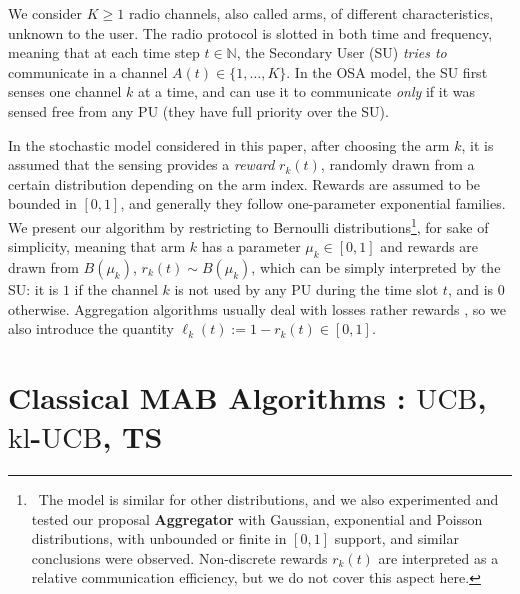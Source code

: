 \documentclass[conference]{IEEEtran}
\theoremstyle{plain}  %
\newcommand{\UCB}[0]{$\mathrm{UCB}$}
\newcommand{\klUCB}[0]{$\mathrm{kl}$-$\mathrm{UCB}$}
\newcommand{\Aggr}[0]{\textbf{Aggregator}}
\begin{document}
We consider $K \ge 1$ radio channels, also called arms, of different characteristics, unknown to the user.
The radio protocol is slotted in both time and frequency,
meaning that at each time step $t \in \mathbb{N}$,
the Secondary User (SU) \emph{tries to}
communicate in a channel $A(t) \in \{1, \dots, K\}$.
In the OSA model, the SU first senses one channel $k$ at a time, and can use it to communicate
\emph{only} if it was sensed free from any PU
(they have full priority over the SU).

In the stochastic model considered in this paper, after choosing the arm $k$, it is assumed that the sensing provides a \emph{reward} $r_k(t)$, randomly drawn from a certain distribution depending on the arm index.
Rewards are assumed to be bounded in $[0, 1]$,
and generally they follow one-parameter exponential families.
We present our algorithm by restricting to Bernoulli distributions\footnote{~The model is similar for other distributions, and we also experimented and tested our proposal \Aggr{} with Gaussian, exponential and Poisson distributions, with unbounded or finite in $[0, 1]$ support, and similar conclusions were observed. Non-discrete rewards $r_k(t)$ are interpreted as a relative communication efficiency, but we do not cover this aspect here.},
for sake of simplicity, meaning that arm $k$ has a parameter $\mu_k \in [0, 1]$ and rewards are drawn from $B(\mu_k)$, $r_k(t) \sim B(\mu_k)$,
which can be simply interpreted by the SU: it is $1$ if the channel $k$ is not used by any PU during the time slot $t$, and is $0$ otherwise.
Aggregation algorithms usually deal with losses rather rewards \cite{Maillard11}, so we also introduce the quantity $\ell_k(t) := 1 - r_k(t) \in [0,1]$. %


\section{Classical MAB Algorithms : \UCB, \klUCB, TS}\label{sec:MABalgo}
\end{document}
